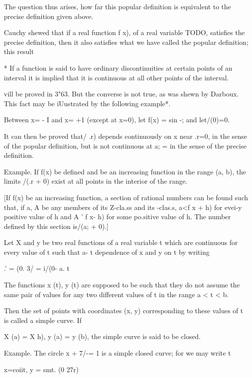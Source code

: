 The question thus arises, how far this popular definition is
equivalent to the precise definition given above.

Cauchy shewed that if a real function f x), of a real variable TODO,
satisfies the precise definition, then it also satisfies what we have
called the popular definition; this result

* If a function is said to have ordinary discontinuities at certain
points of an interval it is implied that it is continuous at all other
points of the interval.

%
%

vill be proved in 3"63. But the converse is not true, as was shewn by
Darboux. This fact may be iUustrated by the following example*.

Between x= - I and x= +1 (except at x=0), let f(x) = sin -; and
let/(0)=0.

It can then be proved that/ .r) depends continuously on x near .r=0,
in the sense of the popular definition, but is not continuous at a; =
in the sense of the precise definition.

Example. If f(x) be defined and be an increasing function in the range
(a, b), the limits /(.r + 0) exist at all points in the interior of
the range.

[If f(x) be an increasing function, a section of rational numbers can
be found such that, if a, A be any members of its Z-cla.ss and its
-clas.s, a<f x + h) for evei-y positive value of h and A ' f x- h) for
some po.sitive value of h. The number defined by this section is/(a; +
0).]


Let X and y be two real functions of a real variable t which are
continuous for every value of t such that a- t %
dependence of x and y on t by writing

.' = (0. 3/ = i/(0- a. t%

The functions x (t), y (t) are supposed to be such that they do not
assume the same pair of values for any two different values of t in
the range a < t < b.

Then the set of points with coordinates (x, y) corresponding to these
values of t is called a simple curve. If

X (a) = X h), y (a) = y (b), the simple curve is said to be closed.

Example. The circle x + 7/-= 1 is a simple closed curve; for we may
write t

x=coiit, y = smt. (0 27r)

